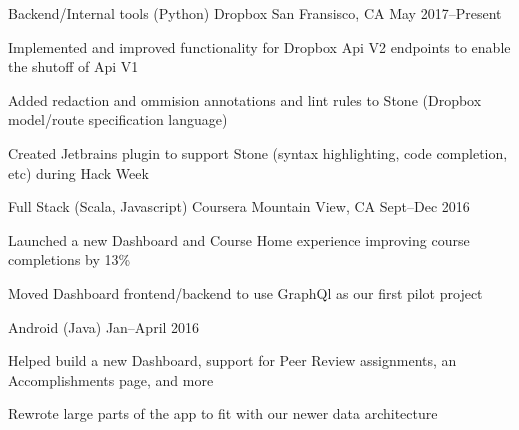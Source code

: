 

\begin{cventries}

  \cventry
    {Backend/Internal tools (Python)} %
    {Dropbox} %
    {San Fransisco, CA} %
    {May 2017--Present} %
    {
      \begin{cvitems} %
        \item {Implemented and improved functionality for Dropbox Api V2 endpoints to enable the shutoff of Api V1}
        \item {Added redaction and ommision annotations and lint rules to Stone (Dropbox model/route specification language)}
        \item {Created Jetbrains plugin to support Stone (syntax highlighting, code completion, etc) during Hack Week}
      \end{cvitems}
    }

  \cventry
    {Full Stack (Scala, Javascript)} %
    {Coursera} %
    {Mountain View, CA} %
    {Sept--Dec 2016} %
    {
      \begin{cvitems} %
        \item {Launched a new Dashboard and Course Home experience improving course completions by 13\%}
        \item {Moved Dashboard frontend/backend to use GraphQl as our first pilot project}
      \end{cvitems}
    }

  \cventry
    {Android (Java)} %
    {} %
    {} %
    {Jan--April 2016} %
    {
      \begin{cvitems} %
        \item {Helped build a new Dashboard, support for Peer Review assignments, an Accomplishments page, and more}
        \item {Rewrote large parts of the app to fit with our newer data architecture}
      \end{cvitems}
    }


\end{cventries}
